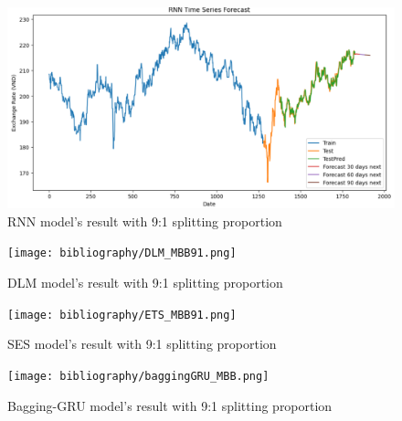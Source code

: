 \documentclass{ieeeojies}
\begin{document}
\begin{figure}[H]
  \centering
  \begin{minipage}{0.8\linewidth}
    \centering
    \includegraphics[width=\linewidth]{RNN_GBP.png}
    \caption{RNN model's result with 9:1 splitting proportion}
    \label{fig19}
  \end{minipage}
\end{figure}
\begin{figure}[H]
  \centering
  \begin{minipage}{0.8\linewidth}
    \centering
    \texttt{[image: bibliography/DLM\_MBB91.png]}
    \caption{DLM model's result with 9:1 splitting proportion}
    \label{fig20}
  \end{minipage}
\end{figure}
\begin{figure}[H]
  \centering
  \begin{minipage}{0.8\linewidth}
    \centering
    \texttt{[image: bibliography/ETS\_MBB91.png]}
    \caption{SES model's result with 9:1 splitting proportion}
    \label{fig21}
  \end{minipage}
\end{figure}
\begin{figure}[H]
  \centering
  \begin{minipage}{0.8\linewidth}
    \centering
    \texttt{[image: bibliography/baggingGRU\_MBB.png]}
    \caption{Bagging-GRU model's result with 9:1 splitting proportion}
    \label{mbbbggg}
  \end{minipage}
\end{figure}
\end{document}
